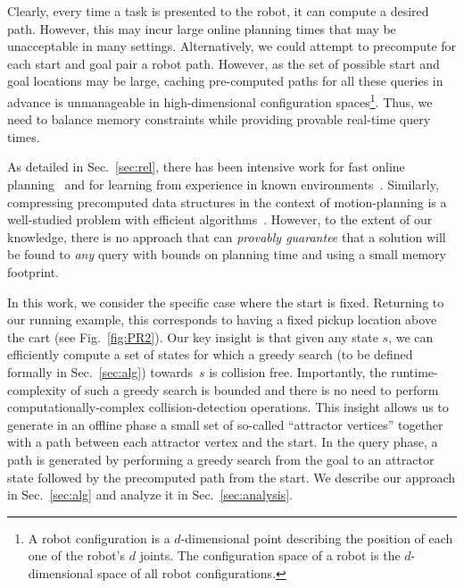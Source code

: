 \documentclass[a4paper,10pt]{article}
\begin{document}
Clearly, every time a task is presented to the robot, it can compute a desired path.
However, this may incur large online planning times that may be unacceptable in many settings.
%
Alternatively, we could attempt to precompute for each start and goal pair a robot path.
However, as the set of possible start and goal locations may be large, caching pre-computed paths for all these queries in advance is unmanageable in high-dimensional configuration spaces\footnote{
A robot configuration is a $d$-dimensional point describing the position of each one of the robot's $d$ joints.
The configuration space of a robot is the $d$-dimensional space of all robot configurations.}.
Thus, we need to balance memory constraints while providing provable real-time query times.

As detailed in Sec.~\ref{sec:rel}, there has been intensive work 
for fast online planning~\cite{LA18} and 
for learning from experience in known environments~\cite{PCCL12,PDCL13,berenson2012robot,CSMOC15}.
Similarly, compressing precomputed data structures in the context of motion-planning is a well-studied problem with efficient algorithms~\cite{SSAH14,DB14}.
However, to the extent of our knowledge, there is no approach that can \emph{provably guarantee} that a solution will be found to \emph{any} query with bounds on planning time and using a small memory footprint.


In this work, we consider the specific case where the start is fixed. Returning to our running example, this corresponds to having a fixed pickup location above the cart (see Fig.~\ref{fig:PR2}).
%
Our key insight is that given any state $s$, we can efficiently compute a set of states for which a greedy search (to be defined formally in Sec.~\ref{sec:alg}) towards~$s$ is collision free.
Importantly, the runtime-complexity of such a greedy search is bounded and there is no need to perform computationally-complex collision-detection operations. 
This insight allows us to generate in an offline phase a small set of so-called ``attractor vertices'' together with a path between each attractor vertex and the start.
In the query phase, a path is generated by performing a greedy search from the goal to an attractor state followed by the precomputed path from the start.
We describe our approach in Sec.~\ref{sec:alg} and analyze it in Sec.~\ref{sec:analysis}.
\end{document}
